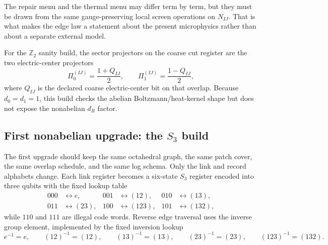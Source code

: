 \documentclass[11pt]{article}
\begin{document}
The repair menu and the thermal menu may differ term by term, but they must be drawn from
the same gauge-preserving local screen operations on $N_{IJ}$. That is what makes the edge law a
statement about the present microphysics rather than about a separate external model.

For the $\mathbb Z_2$ sanity build, the sector projectors on the coarse cut register are the two
electric-center projectors
\begin{equation}
\Pi_0^{(IJ)}=\frac{1+Q_{IJ}}{2},
\qquad
\Pi_1^{(IJ)}=\frac{1-Q_{IJ}}{2},
\end{equation}
where $Q_{IJ}$ is the declared coarse electric-center bit on that overlap. Because
$d_0=d_1=1$, this build checks the abelian Boltzmann/heat-kernel shape but does not expose
the nonabelian $d_R$ factor.

\subsection{First nonabelian upgrade: the $S_3$ build}

The first upgrade should keep the same octahedral graph, the same patch cover, the same overlap
schedule, and the same log schema. Only the link and record alphabets change. Each link register
becomes a six-state $S_3$ register encoded into three qubits with the fixed lookup table
\begin{align}
000&\leftrightarrow e, &
001&\leftrightarrow (12), &
010&\leftrightarrow (13),\\
011&\leftrightarrow (23), &
100&\leftrightarrow (123), &
101&\leftrightarrow (132),
\end{align}
while $110$ and $111$ are illegal code words. Reverse edge traversal uses the inverse group
element, implemented by the fixed inversion lookup
\begin{equation}
e^{-1}=e,\qquad (12)^{-1}=(12),\qquad (13)^{-1}=(13),\qquad (23)^{-1}=(23),\qquad
(123)^{-1}=(132).
\end{equation}
\end{document}

